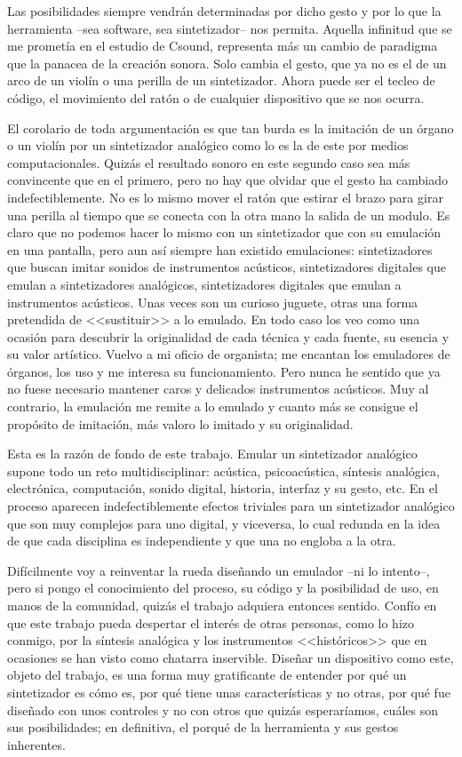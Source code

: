 Las posibilidades siempre vendrán determinadas por dicho gesto y por lo que la herramienta --sea software, sea sintetizador-- nos permita. Aquella infinitud que se me prometía en el estudio de Csound, representa más un cambio de paradigma que la panacea de la creación sonora. Solo cambia el gesto, que ya no es el de un arco de un violín o una perilla de un sintetizador. Ahora puede ser el tecleo de código, el movimiento del ratón o de cualquier dispositivo que se nos ocurra. 

El corolario de toda argumentación es que tan burda es la imitación de un órgano o un violín por un sintetizador analógico como lo es la de este por medios computacionales. Quizás el resultado sonoro en este segundo caso sea más convincente que en el primero, pero no hay que olvidar que el gesto ha cambiado indefectiblemente. No es lo mismo mover el ratón que estirar el brazo para girar una perilla al tiempo que se conecta con la otra mano la salida de un modulo. Es claro que no podemos hacer lo mismo con un sintetizador que con su emulación en una pantalla, pero aun así siempre han existido emulaciones: sintetizadores que buscan imitar sonidos de instrumentos acústicos, sintetizadores digitales que emulan a sintetizadores analógicos, sintetizadores digitales que emulan a instrumentos acústicos. Unas veces son un curioso juguete, otras una forma pretendida de <<sustituir>> a lo emulado. En todo caso los veo como una ocasión para descubrir la originalidad de cada técnica y cada fuente, su esencia y su valor artístico. Vuelvo a mi oficio de organista; me encantan los emuladores de órganos, los uso y me interesa su funcionamiento. Pero nunca he sentido que ya no fuese necesario mantener caros y delicados instrumentos acústicos. Muy al contrario, la emulación me remite a lo emulado y cuanto más se consigue el propósito de imitación, más valoro lo imitado y su originalidad.

Esta es la razón de fondo de este trabajo. Emular un sintetizador analógico supone todo un reto multidisciplinar: acústica, psicoacústica, síntesis analógica, electrónica, computación, sonido digital, historia, interfaz y su gesto, etc. En el proceso aparecen indefectiblemente efectos triviales para un sintetizador analógico que son muy complejos para uno digital, y viceversa, lo cual redunda en la idea de que cada disciplina es independiente y que una no engloba a la otra. 

Difícilmente voy a reinventar la rueda diseñando un emulador --ni lo intento--, pero si pongo el conocimiento del proceso, su código y la posibilidad de uso, en manos de la comunidad, quizás el trabajo adquiera entonces sentido. Confío en que este trabajo pueda despertar el interés de otras personas, como lo hizo conmigo, por la síntesis analógica y los instrumentos <<históricos>> que en ocasiones se han visto como chatarra inservible. Diseñar un dispositivo como este, objeto del trabajo, es una forma muy gratificante de entender por qué un sintetizador es cómo es, por qué tiene unas características y no otras, por qué fue diseñado con unos controles y no con otros que quizás esperaríamos, cuáles son sus posibilidades; en definitiva, el porqué de la herramienta y sus gestos inherentes.

